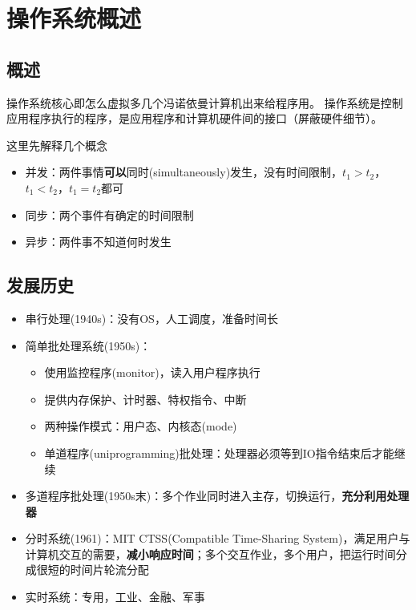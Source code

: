 
\section{操作系统概述}
\subsection{概述}
操作系统核心即怎么虚拟多几个冯诺依曼计算机出来给程序用。
操作系统是控制应用程序执行的程序，是应用程序和计算机硬件间的接口（屏蔽硬件细节）。

这里先解释几个概念
\begin{itemize}
	\item 并发：两件事情\textbf{可以}同时(simultaneously)发生，没有时间限制，$t_1>t_2$，$t_1<t_2$，$t_1=t_2$都可
	\item 同步：两个事件有确定的时间限制
	\item 异步：两件事不知道何时发生
\end{itemize}


\subsection{发展历史}
\begin{itemize}
	\item 串行处理(1940s)：没有OS，人工调度，准备时间长
	\item 简单批处理系统(1950s)：
	\begin{itemize}
		\item 使用监控程序(monitor)，读入用户程序执行
		\item 提供内存保护、计时器、特权指令、中断
		\item 两种操作模式：用户态、内核态(mode)
		\item 单道程序(uniprogramming)批处理：处理器必须等到IO指令结束后才能继续
	\end{itemize}
	\item 多道程序批处理(1950s末)：多个作业同时进入主存，切换运行，\textbf{充分利用处理器}
	\item 分时系统(1961)：MIT CTSS(Compatible Time-Sharing System)，满足用户与计算机交互的需要，\textbf{减小响应时间}；多个交互作业，多个用户，把运行时间分成很短的时间片轮流分配
	\item 实时系统：专用，工业、金融、军事
\end{itemize}

